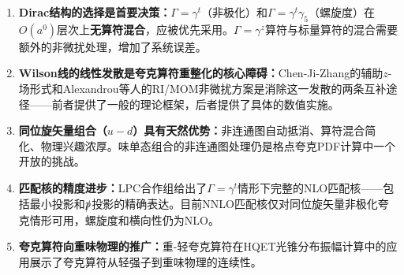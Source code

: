 \documentclass[12pt,a4paper]{ctexart}
\theoremstyle{definition}
\begin{document}
\begin{enumerate}
    \item \textbf{Dirac结构的选择是首要决策：}$\Gamma = \gamma^t$（非极化）和$\Gamma = \gamma^t\gamma_5$（螺旋度）在$O(a^0)$层次上\textbf{无算符混合}，应被优先采用\cite{Liu2019isovector}。$\Gamma = \gamma^z$算符与标量算符的混合需要额外的非微扰处理，增加了系统误差\cite{Alexandrou2017}。

    \item \textbf{Wilson线的线性发散是夸克算符重整化的核心障碍：}Chen-Ji-Zhang的辅助$z$-场形式\cite{Chen2016improved}和Alexandrou等人的RI/MOM非微扰方案\cite{Alexandrou2017}是消除这一发散的两条互补途径——前者提供了一般的理论框架，后者提供了具体的数值实施。

    \item \textbf{同位旋矢量组合（$u-d$）具有天然优势：}非连通图自动抵消、算符混合简化、物理兴趣浓厚\cite{LP3helicity}。味单态组合的非连通图处理仍是格点夸克PDF计算中一个开放的挑战。

    \item \textbf{匹配核的精度进步：}LPC合作组\cite{Liu2019isovector}给出了$\Gamma = \gamma^t$情形下完整的NLO匹配核——包括最小投影和$\slashed{p}$投影的精确表达。目前NNLO匹配核仅对同位旋矢量非极化夸克情形可用，螺旋度和横向性仍为NLO。

    \item \textbf{夸克算符向重味物理的推广：}重-轻夸克算符在HQET光锥分布振幅计算中的应用\cite{Han2025heavy}展示了夸克算符从轻强子到重味物理的连续性。
\end{enumerate}
\end{document}
